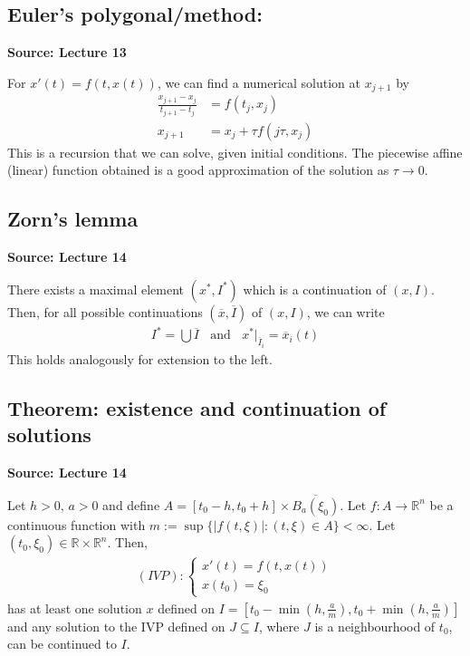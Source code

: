 \documentclass[11pt]{article}
\newcommand{\R}{\mathbb{R}}
\begin{document}
\subsection{Euler's polygonal/method:} 
\textbf{Source: Lecture 13}

For $x'(t) = f(t, x(t))$, we can find a numerical solution at $x_{j+1}$ by 
\begin{align*}
    \frac{x_{j+1} - x_j}{t_{j+1} - t_j} &= f(t_j, x_j) \tag{take $t_j = j\tau $ for all $j$}\\
    x_{j+1} &= x_j + \tau f(j\tau, x_j) 
\end{align*}
This is a recursion that we can solve, given initial conditions. The piecewise affine (linear) function obtained is a good approximation of the solution as $\tau \to 0$. 

\subsection{Zorn's lemma}
\textbf{Source: Lecture 14}

There exists a maximal element $(x^*, I^*)$ which is a continuation of $(x, I)$. Then, for all possible continuations $(\overline{x}, \overline{I})$ of $(x, I)$, we can write
\begin{align*}
    I^* = \bigcup \overline{I} ~~~~\text{and}~~~~ x^*|_{\overline{I}_i} = \overline{x}_i(t)
\end{align*}
This holds analogously for extension to the left.

\subsection{Theorem: existence and continuation of solutions}
\textbf{Source: Lecture 14}

Let $h> 0$, $a > 0$ and define $A = [t_0 - h, t_0 + h] \times \overline{B_a(\xi_0)}$. Let $f: A \to \R^n$ be a continuous function with $m := \sup \{|f(t, \xi)|: (t, \xi) \in A\} < \infty$. Let $(t_0, \xi_0) \in \R \times \R^n$. Then, 
\begin{align*}
    (IVP): \begin{cases}
        x'(t) = f(t, x(t)) \\
    x(t_0) = \xi_0
    \end{cases}
\end{align*}
has at least one solution $x$ defined on $I = [t_0 - \min(h, \frac{a}{m}), t_0 + \min(h, \frac{a}{m})]$ and any solution to the IVP defined on $J \subseteq I$, where $J$ is a neighbourhood of $t_0$, can be continued to $I$. 
\end{document}
